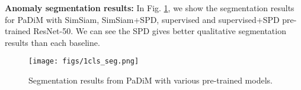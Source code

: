 \documentclass[runningheads]{llncs}
\begin{document}
\noindent\textbf{Anomaly segmentation results: }
In Fig. \ref{fig:1cls_seg}, we show the segmentation results for PaDiM with SimSiam, SimSiam+SPD, supervised and supervised+SPD pre-trained ResNet-50. We can see the SPD gives better qualitative segmentation results than each baseline.
\begin{figure}[!t]
  \centering
  \texttt{[image: figs/1cls\_seg.png]}
  \vspace{-.75cm}
  \caption{Segmentation results from PaDiM with various pre-trained models.}
  \label{fig:1cls_seg}
\end{figure}

\clearpage
\end{document}
